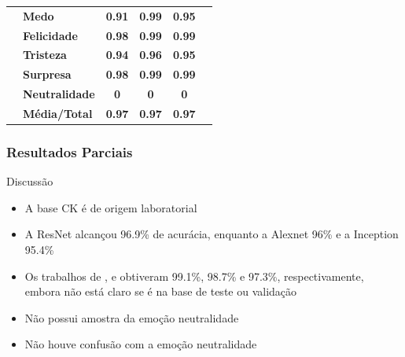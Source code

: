 \documentclass{beamer}
\begin{document}
\begin{frame}
\begin{table}[]
\begin{tabular}{llcccc}
                                       & \textbf{Medo}         & \textbf{0.91}                         & \textbf{0.99}                          & \textbf{0.95}                         &                                       \\
                                       & \textbf{Felicidade}   & \textbf{0.98}                         & \textbf{0.99}                          & \textbf{0.99}                         &                                       \\
                                       & \textbf{Tristeza}     & \textbf{0.94}                         & \textbf{0.96}                          & \textbf{0.95}                         &                                       \\
                                       & \textbf{Surpresa}     & \textbf{0.98}                         & \textbf{0.99}                          & \textbf{0.99}                         &                                       \\
                                       & \textbf{Neutralidade} & \textbf{0}                            & \textbf{0}                             & \textbf{0}                            &                                       \\
                                       & \textbf{Média/Total}  & \textbf{0.97}                         & \textbf{0.97}                          & \textbf{0.97}                         &                                       \\ \hline
\end{tabular}
\end{table} 
 
\end{frame}


\begin{frame}
\frametitle{Resultados Parciais}
 \begin{block}{Discussão}
\begin{itemize}
\item A base CK é de origem laboratorial
\pause
\item A ResNet alcançou 96.9\% de acurácia, enquanto a Alexnet 96\% e a Inception 95.4\%
\pause
\item Os trabalhos de \cite{art1}, \cite{art11} e \cite{art7} obtiveram  99.1\%, 98.7\% e 97.3\%, respectivamente, embora não está claro se é na base de teste ou validação
\pause
\item Não possui amostra da emoção neutralidade
\pause
\item Não houve confusão com a emoção neutralidade
\end{itemize}
\end{block}
\end{frame}
\end{document}
